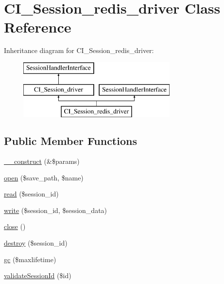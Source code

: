 \hypertarget{class_c_i___session__redis__driver}{}\section{C\+I\+\_\+\+Session\+\_\+redis\+\_\+driver Class Reference}
\label{class_c_i___session__redis__driver}
Inheritance diagram for C\+I\+\_\+\+Session\+\_\+redis\+\_\+driver\+:\begin{figure}[H]
\begin{center}
\leavevmode
\includegraphics[height=3.000000cm]{class_c_i___session__redis__driver}
\end{center}
\end{figure}
\subsection*{Public Member Functions}
\begin{DoxyCompactItemize}
\item 
\mbox{\hyperlink{class_c_i___session__redis__driver_aa37861b0b1953ec1958bcafb7ecdbca6}{\+\_\+\+\_\+construct}} (\&\$params)
\item 
\mbox{\hyperlink{class_c_i___session__redis__driver_a3ed178ce66f815fee5bca28b0673260e}{open}} (\$save\+\_\+path, \$name)
\item 
\mbox{\hyperlink{class_c_i___session__redis__driver_a8bc2c57310723fefb13205d211156d52}{read}} (\$session\+\_\+id)
\item 
\mbox{\hyperlink{class_c_i___session__redis__driver_a08f684e434d6eeed20d446dfbeb7c3c8}{write}} (\$session\+\_\+id, \$session\+\_\+data)
\item 
\mbox{\hyperlink{class_c_i___session__redis__driver_a80a607cb3ba4058bca739f4c736e52bd}{close}} ()
\item 
\mbox{\hyperlink{class_c_i___session__redis__driver_a8a1ac68fa77b2f654ffadc365d125fe5}{destroy}} (\$session\+\_\+id)
\item 
\mbox{\hyperlink{class_c_i___session__redis__driver_ae65e8f9d43d2c4ca690202c9d56d1d01}{gc}} (\$maxlifetime)
\item 
\mbox{\hyperlink{class_c_i___session__redis__driver_ada12678b34075dd6553b72bfad91a761}{validate\+Session\+Id}} (\$id)
\end{DoxyCompactItemize}
